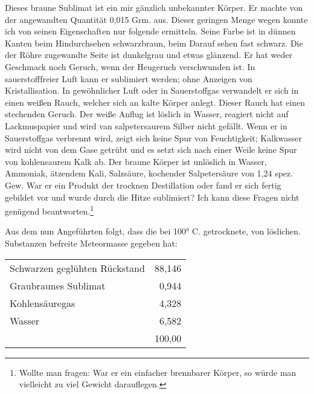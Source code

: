 \documentclass[a4paper, 11pt, oneside]{article}
\begin{document}
Dieses braune Sublimat ist ein mir gänzlich unbekannter Körper. Er machte von der angewandten Quantität 0,015 Grm. aus. Dieser geringen Menge wegen konnte ich von seinen Eigenschaften nur folgende ermitteln. Seine Farbe ist in dünnen Kanten beim Hindurchsehen schwarzbraun, beim Darauf sehen fast schwarz. Die der Röhre zugewandte Seite ist dunkelgrau und etwas glänzend. Er hat weder Geschmack noch Geruch, wenn der Heugeruch verschwunden ist. In sauerstofffreier Luft kann er sublimiert werden; ohne Anzeigen von Kristallisation. In gewöhnlicher Luft oder in Sauerstoffgas verwandelt er sich in einen weißen Rauch, welcher sich an kalte Körper anlegt. Dieser Rauch hat einen stechenden Geruch. Der weiße Anflug ist löslich in Wasser, reagiert nicht auf Lackmuspapier und wird van salpetersaurem Silber nicht gefällt. Wenn er in Sauerstoffgas verbrennt wird, zeigt sich keine Spur von Feuchtigkeit; Kalkwasser wird nicht von dem Gase getrübt und es setzt sich nach einer Weile keine Spur von kohlensaurem Kalk ab. Der braune Körper ist unlöslich in Wasser, Ammoniak, ätzendem Kali, Salzsäure, kochender Salpetersäure von 1,24 spez. Gew. War er ein Produkt der trocknen Destillation oder fand er sich fertig gebildet vor und wurde durch die Hitze sublimiert? Ich kann diese Fragen nicht genügend beantworten.\footnote{Wollte man fragen: War er ein einfacher brennbarer Körper, so würde man vielleicht zu viel Gewicht darauflegen.}

Aus dem nun Angeführten folgt, dass die bei 100° C. getrocknete, von löslichen. Substanzen befreite Meteormasse gegeben hat:
\begin{center}
\begin{tabular}{ l r }
    Schwarzen geglühten Rückstand & 88,146\\
    Graubraunes Sublimat & 0,944\\
    Kohlensäuregas & 4,328\\
    Wasser & 6,582\\
    & 100,00\\
\end{tabular}
\end{center}
\end{document}
